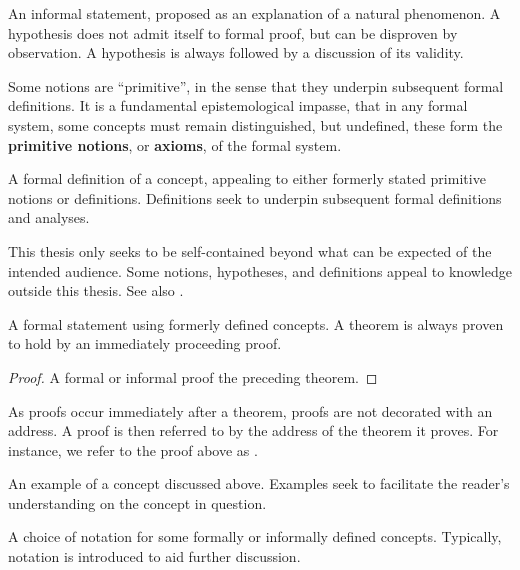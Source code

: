 \begin{hypothesis} An informal statement, proposed as an explanation of a
natural phenomenon. A hypothesis does not admit itself to formal proof, but can
be disproven by observation. A hypothesis is always followed by a discussion of
its validity. \end{hypothesis}

Some notions are ``primitive'', in the sense that they underpin subsequent
formal definitions. It is a fundamental epistemological impasse, that in any
formal system, some concepts must remain distinguished, but undefined, these
form the \textbf{primitive notions}, or \textbf{axioms}, of the formal system.

\begin{definition} A formal definition of a concept, appealing to either
formerly stated primitive notions or definitions. Definitions seek to underpin
subsequent formal definitions and analyses. \end{definition}

This thesis only seeks to be self-contained beyond what can be expected of the
intended audience. Some notions, hypotheses, and definitions appeal to
knowledge outside this thesis. See also .

\begin{theorem} \label{thm:theorem} A formal statement using formerly
defined concepts. A theorem is always proven to hold by an immediately
proceeding proof.\end{theorem}

\begin{proof} A formal or informal proof the preceding theorem. \end{proof}

As proofs occur immediately after a theorem, proofs are not decorated with an
address. A proof is then referred to by the address of the theorem it proves.
For instance, we refer to the proof above as .

\begin{example} An example of a concept discussed above. Examples seek to
facilitate the reader's understanding on the concept in question.
\end{example}

\begin{notation}

A choice of notation for some formally or informally defined concepts.
Typically, notation is introduced to aid further discussion.

\end{notation}

